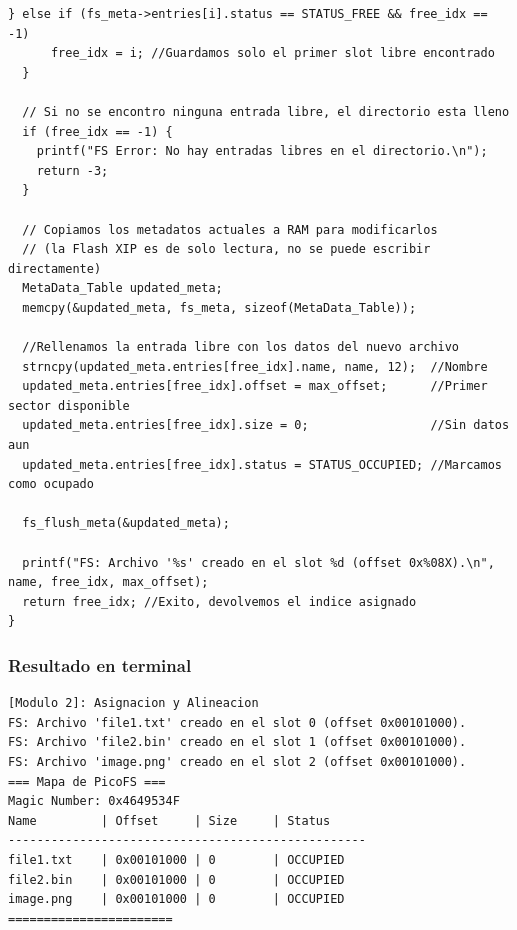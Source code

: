 \documentclass[12pt,letterpaper]{article}
\begin{document}
\begin{lstlisting}[style=modernc, caption={Módulo 2: registro de un nuevo archivo con alineación a sectores}]
    } else if (fs_meta->entries[i].status == STATUS_FREE && free_idx == -1)
      free_idx = i; //Guardamos solo el primer slot libre encontrado
  }
  
  // Si no se encontro ninguna entrada libre, el directorio esta lleno
  if (free_idx == -1) {
    printf("FS Error: No hay entradas libres en el directorio.\n");
    return -3;
  }
  
  // Copiamos los metadatos actuales a RAM para modificarlos
  // (la Flash XIP es de solo lectura, no se puede escribir directamente)
  MetaData_Table updated_meta;
  memcpy(&updated_meta, fs_meta, sizeof(MetaData_Table));

  //Rellenamos la entrada libre con los datos del nuevo archivo
  strncpy(updated_meta.entries[free_idx].name, name, 12);  //Nombre
  updated_meta.entries[free_idx].offset = max_offset;      //Primer sector disponible
  updated_meta.entries[free_idx].size = 0;                 //Sin datos aun
  updated_meta.entries[free_idx].status = STATUS_OCCUPIED; //Marcamos como ocupado
  
  fs_flush_meta(&updated_meta);
  
  printf("FS: Archivo '%s' creado en el slot %d (offset 0x%08X).\n", name, free_idx, max_offset);
  return free_idx; //Exito, devolvemos el indice asignado
}
\end{lstlisting}

\bigskip

\subsubsection*{Resultado en terminal}

\begin{Verbatim}[frame=single, fontsize=\footnotesize]
[Modulo 2]: Asignacion y Alineacion
FS: Archivo 'file1.txt' creado en el slot 0 (offset 0x00101000).
FS: Archivo 'file2.bin' creado en el slot 1 (offset 0x00101000).
FS: Archivo 'image.png' creado en el slot 2 (offset 0x00101000).
=== Mapa de PicoFS ===
Magic Number: 0x4649534F
Name         | Offset     | Size     | Status
--------------------------------------------------
file1.txt    | 0x00101000 | 0        | OCCUPIED
file2.bin    | 0x00101000 | 0        | OCCUPIED
image.png    | 0x00101000 | 0        | OCCUPIED
=======================
\end{Verbatim}
\end{document}
